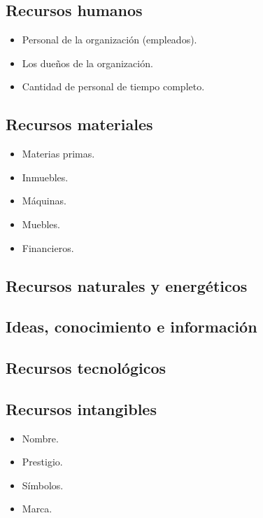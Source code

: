 \documentclass[12pt, spanish, a5paper]{article}
\begin{document}
\subsection{Recursos humanos}

\begin{itemize}
	\item Personal de la organización (empleados).
	\item Los dueños de la organización.
	\item Cantidad de personal de tiempo completo.
\end{itemize}

\subsection{Recursos materiales}

\begin{itemize}
	\item Materias primas.
	\item Inmuebles.
	\item Máquinas.
	\item Muebles.
	\item Financieros.
\end{itemize}

\subsection{Recursos naturales y energéticos}

\subsection{Ideas, conocimiento e información}

\subsection{Recursos tecnológicos}

\subsection{Recursos intangibles}

\begin{itemize}
	\item Nombre.
	\item Prestigio.
	\item Símbolos.
	\item Marca.
\end{itemize}
\end{document}

